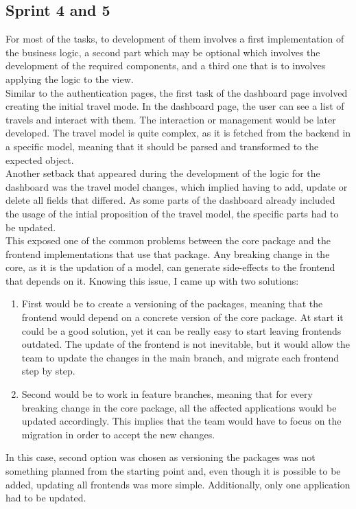 \documentclass[../memory.tex]{subfiles}
\begin{document}
\subsection{Sprint 4 and 5}
For most of the tasks, to development of them involves a first implementation of
the business logic, a second part which may be optional which involves the
development of the required components, and a third one that is to involves
applying the logic to the view.
\\[8pt]
Similar to the authentication pages, the first task of the dashboard page
involved creating the initial travel mode. In the dashboard page, the user can
see a list of travels and interact with them. The interaction or management
would be later developed. The travel model is quite complex, as it is
fetched from the backend in a specific model, meaning that it should be parsed
and transformed to the expected object.
\\
Another setback that appeared during the development of the logic for the
dashboard was the travel model changes, which implied having to add, update or
delete all fields that differed. As some parts of the dashboard already included
the usage of the intial proposition of the travel model, the specific parts had
to be updated.
\\[8pt]
This exposed one of the common problems between the core package and the
frontend implementations that use that package. Any breaking change in the core,
as it is the updation of a model, can generate side-effects to the frontend that
depends on it. Knowing this issue, I came up with two solutions:
\begin{enumerate}
	\item First would be to create a versioning of the packages, meaning that the
	      frontend would depend on a concrete version of the core package. At start it
	      could be a good solution, yet it can be really easy to start leaving
	      frontends outdated. The update of the frontend is not inevitable, but it
	      would allow the team to update the changes in the main branch, and migrate
	      each frontend step by step.
	\item Second would be to work in feature branches, meaning that for every
	      breaking change in the core package, all the affected applications would be
	      updated accordingly. This implies that the team would have to focus on the
	      migration in order to accept the new changes.
\end{enumerate}
In this case, second option was chosen as versioning the packages was not
something planned from the starting point and, even though it is possible to be
added, updating all frontends was more simple. Additionally, only one
application had to be updated.
\end{document}
